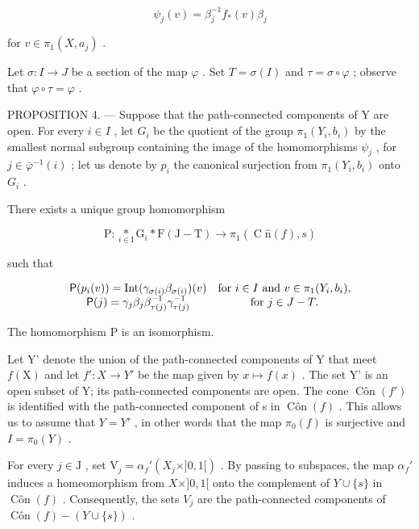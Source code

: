 \[
\psi_ {j} (v) = \beta_ {j} ^ {- 1} f _ {*} (v) \beta_ {j}
\]

for \(v \in \pi_1(X, a_j)\) .

Let \(\sigma\colon I\to J\) be a section of the map \(\varphi\) . Set \(T=\sigma(I)\) and \(\tau=\sigma\circ\varphi\) ; observe that \(\varphi\circ\tau=\varphi\) .

PROPOSITION 4. --- Suppose that the path-connected components of Y are open. For every \(i \in I\) , let \(G_i\) be the quotient of the group \(\pi_1(Y_i, b_i)\) by the smallest normal subgroup containing the image of the homomorphisms \(\psi_j\) , for \(j \in \overline{\varphi}^{-1}(i)\) ; let us denote by \(p_i\) the canonical surjection from \(\pi_1(Y_i, b_i)\) onto \(G_i\) .

There exists a unique group homomorphism

\[
\mathrm{P} \colon \underset {i \in \mathrm{I}} {*} \mathrm{G} _ {i} * \mathrm{F} (\mathrm{J} - \mathrm{T}) \to \pi_ {1} (\operatorname{C} \hat {\mathrm{n}} (f), s)
\]

such that

\[
\begin{array}{c c} \mathsf {P} (p _ {i} (v)) = \operatorname{Int} (\gamma_ {\sigma (i)} \beta_ {\sigma (i)}) (v) & \text {for } i\in I \text { and } v\in\pi_{1} (Y_{i},b_{i}), \\ \mathsf {P} (j) = \gamma_ {j} \beta_ {j} \beta_ {\tau (j)} ^ {- 1} \gamma_ {\tau (j)} ^ {- 1} & \text {for } j\in J - T. \end{array}
\]

The homomorphism P is an isomorphism.

Let Y' denote the union of the path-connected components of Y that meet \(f(\mathrm{X})\) and let \(f'\colon X \to Y'\) be the map given by \(x \mapsto f(x)\) . The set Y' is an open subset of Y; its path-connected components are open. The cone \(\operatorname{Côn}(f')\) is identified with the path-connected component of s in \(\operatorname{Côn}(f)\) . This allows us to assume that \(Y = Y'\) , in other words that the map \(\pi_{0}(f)\) is surjective and \(I = \pi_{0}(Y)\) .

For every \(j \in \mathrm{J}\) , set \(\mathrm{V}_j = \alpha_f'(X_j \times ]0,1[)\) . By passing to subspaces, the map \(\alpha_f'\) induces a homeomorphism from \(X \times ]0,1[\) onto the complement of \(Y \cup \{s\}\) in \(\operatorname{Côn}(f)\) . Consequently, the sets \(V_j\) are the path-connected components of \(\operatorname{Côn}(f) - (Y \cup \{s\})\) .

